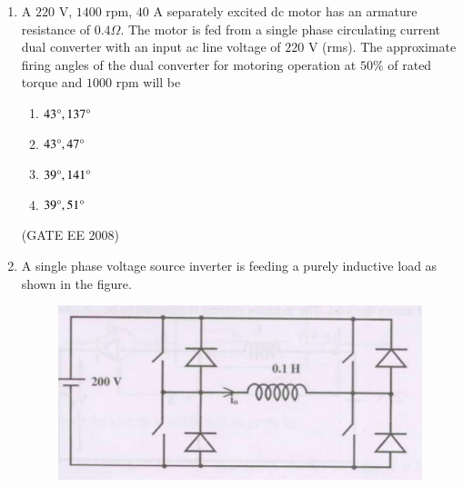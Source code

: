 \documentclass[journal,12pt,onecolumn]{IEEEtran}
\theoremstyle{remark}
\begin{document}
\begin{enumerate}[start=1, label=Q.\arabic*]
\begin{multicols}{4}
\begin{enumerate}[label=(\Alph*)]
    \item $0.518$
    \item $0.608$
    \item $0.852$
    \item $0.902$
\end{enumerate}
\end{multicols}
\hfill (GATE EE 2008)

\item A $220$ V, $1400$ rpm, $40$ A separately excited dc motor has an armature resistance of $0.4 \Omega$. The motor is fed from a single phase circulating current dual converter with an input ac line voltage of $220$ V (rms). The approximate firing angles of the dual converter for motoring operation at $50\%$ of rated torque and $1000$ rpm will be

\begin{multicols}{4}
\begin{enumerate}[label=(\Alph*)]
    \item $43\degree, 137\degree$
    \item $43\degree, 47\degree$
    \item $39\degree, 141\degree$
    \item $39\degree, 51\degree$
\end{enumerate}
\end{multicols}
\hfill (GATE EE 2008)


\item A single phase voltage source inverter is feeding a purely inductive load as shown in the figure.

\begin{figure}[H]
    \centering
    \includegraphics[width=\columnwidth]{Fig/q59.png}
\end{figure}


\end{enumerate}
\end{document}
